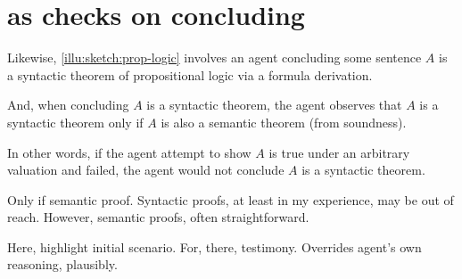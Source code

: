 \section{ as checks on concluding}
\label{cha:zS:sec:curbs:checks}

\begin{note}
  Likewise, \autoref{illu:sketch:prop-logic} involves an agent concluding some sentence \(A\) is a syntactic theorem of propositional logic via a formula derivation.

  And, when concluding \(A\) is a syntactic theorem, the agent observes that \(A\) is a syntactic theorem only if \(A\) is also a semantic theorem (from soundness).

  In other words, if the agent attempt to show \(A\) is true under an arbitrary valuation and failed, the agent would not conclude \(A\) is a syntactic theorem.

  Only if semantic proof.
  Syntactic proofs, at least in my experience, may be out of reach.
  However, semantic proofs, often straightforward.
\end{note}

\begin{note}
  Here, highlight initial scenario.
  For, there, testimony.
  Overrides agent's own reasoning, plausibly.
\end{note}


